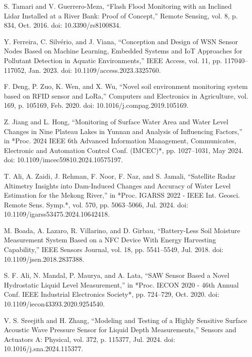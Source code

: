 \documentclass[conference]{IEEEtran}
\begin{document}
\begin{thebibliography}{00}
 S. Tamari and V. Guerrero-Meza, 
``Flash Flood Monitoring with an Inclined Lidar Installed at a River Bank: Proof of Concept,'' 
Remote Sensing, vol. 8, p. 834, Oct. 2016. doi: 10.3390/rs8100834.

 Y. Ferreira, C. Silvério, and J. Viana, 
``Conception and Design of WSN Sensor Nodes Based on Machine Learning, Embedded Systems and IoT Approaches for Pollutant Detection in Aquatic Environments,'' 
IEEE Access, vol. 11, pp. 117040--117052, Jan. 2023. doi: 10.1109/access.2023.3325760.

 F. Deng, P. Zuo, K. Wen, and X. Wu, 
``Novel soil environment monitoring system based on RFID sensor and LoRa,'' 
Computers and Electronics in Agriculture, vol. 169, p. 105169, Feb. 2020. doi: 10.1016/j.compag.2019.105169.

 Z. Jiang and L. Hong, 
``Monitoring of Surface Water Area and Water Level Changes in Nine Plateau Lakes in Yunnan and Analysis of Influencing Factors,'' 
in *Proc. 2024 IEEE 6th Advanced Information Management, Communicates, Electronic and Automation Control Conf. (IMCEC)*, 
pp. 1027--1031, May 2024. doi: 10.1109/imcec59810.2024.10575197.

 T. Ali, A. Zaidi, J. Rehman, F. Noor, F. Naz, and S. Jamali, 
``Satellite Radar Altimetry Insights into Dam-Induced Changes and Accuracy of Water Level Estimation for the Mekong River,'' 
in *Proc. IGARSS 2022 - IEEE Int. Geosci. Remote Sens. Symp.*, vol. 570, pp. 5063--5066, Jul. 2024. 
doi: 10.1109/igarss53475.2024.10642418.


 M. Boada, A. Lazaro, R. Villarino, and D. Girbau, 
``Battery-Less Soil Moisture Measurement System Based on a NFC Device With Energy Harvesting Capability,'' 
IEEE Sensors Journal, vol. 18, pp. 5541--5549, Jul. 2018. 
doi: 10.1109/jsen.2018.2837388.

 S. F. Ali, N. Mandal, P. Maurya, and A. Lata, 
``SAW Sensor Based a Novel Hydrostatic Liquid Level Measurement,'' 
in *Proc. IECON 2020 - 46th Annual Conf. IEEE Industrial Electronics Society*, pp. 724--729, Oct. 2020. 
doi: 10.1109/iecon43393.2020.9254540.

 V. S. Sreejith and H. Zhang, 
``Modeling and Testing of a Highly Sensitive Surface Acoustic Wave Pressure Sensor for Liquid Depth Measurements,'' 
Sensors and Actuators A: Physical, vol. 372, p. 115377, Jul. 2024. doi: 10.1016/j.sna.2024.115377.


\end{thebibliography}
\end{document}
